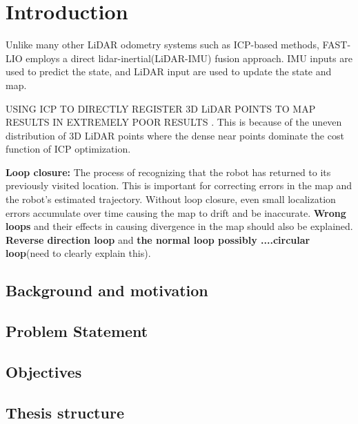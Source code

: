 \chapter{Introduction}
\label{ch:intro}


Unlike many other LiDAR odometry systems such as ICP-based methods, FAST-LIO employs a direct lidar-inertial(LiDAR-IMU) fusion approach. IMU inputs are used to predict the state, and LiDAR input are used to update the state and map.

USING ICP TO DIRECTLY REGISTER 3D LiDAR POINTS TO MAP RESULTS IN EXTREMELY POOR RESULTS \cite{Blanco-Claraco-RSS-19}. This is because of the uneven distribution of 3D LiDAR points where the dense near points dominate the cost function of ICP optimization.

\textbf{Loop closure:} The process of recognizing that the robot has returned to its previously visited location. This is important for correcting errors in the map and the robot's estimated trajectory. Without loop closure, even small localization errors accumulate over time causing the map to drift and be inaccurate. \textbf{Wrong loops} and their effects in causing divergence in the map should also be explained.
\textbf{Reverse direction loop} and \textbf{the normal loop possibly ....circular loop}(need to clearly explain this).
\section{Background and motivation}
\section{Problem Statement}
\section{Objectives}
\section{Thesis structure}


